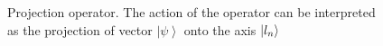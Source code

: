 \begin{figure}
\centering



\caption{Projection operator. The action of the operator can be
  interpreted as the projection of vector $\left|\psi\right>$ onto the axis $\ket{l_n}$}
\label{figAddProject}
\end{figure}
